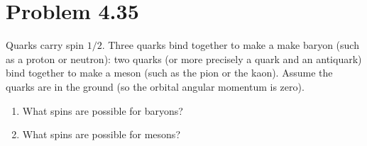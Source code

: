 \documentclass[../main.tex]{subfiles}
\begin{document}
\section{Problem 4.35}

Quarks carry spin $1/2$.
Three quarks bind together to make a make baryon (such as a proton or neutron): two quarks (or more precisely a quark and an antiquark) bind together to make a meson (such as the pion or the kaon).
Assume the quarks are in the ground (so the orbital angular momentum is zero).

\begin{enumerate}
    \item What spins are possible for baryons?
    \item What spins are possible for mesons?
\end{enumerate}
\end{document}
